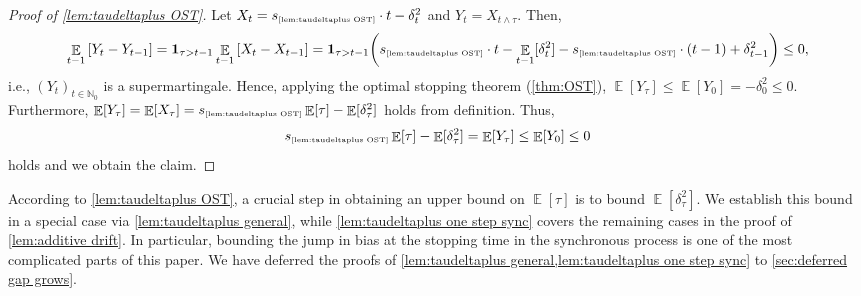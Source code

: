 \documentclass[letterpaper,11pt]{article}
\newcommand{\indicator}{\mathbf{1}}
\DeclareMathOperator*{\E}{\mathbb{E}}
\newcommand{\Nat}{\mathbb{N}}
\newcommand{\varianceref}[1]{\variance_{\mbox{\tiny\ref{#1}}}}
\newcommand{\variance}{s}
\begin{document}
\begin{proof}[Proof of \cref{lem:taudeltaplus OST}]
    Let $X_t=\varianceref{lem:taudeltaplus OST} \cdot t-\delta_t^2$
    and $Y_t=X_{t\wedge \tau}$.
    Then,
    \begin{align*}
    \E_{t-1}\qty[Y_t-Y_{t-1}]
    =\indicator_{\tau>t-1}\E_{t-1}\qty[X_t-X_{t-1}]
    =\indicator_{\tau>t-1}\qty(\varianceref{lem:taudeltaplus OST}\cdot t-\E_{t-1}[\delta_t^2]-\varianceref{lem:taudeltaplus OST}\cdot (t-1)+\delta_{t-1}^2)
    \leq 0,
    \end{align*}
    i.e., $(Y_t)_{t\in \Nat_0}$ is a supermartingale.
    Hence, applying the optimal stopping theorem (\cref{thm:OST}),
    $\E[Y_\tau]\leq \E[Y_0]=-\delta_0^2\leq 0$.
    Furthermore, $\E[Y_\tau]=\E[X_\tau]=\varianceref{lem:taudeltaplus OST}\E[\tau]-\E[\delta_\tau^2]$ holds from definition.
    Thus, 
    \begin{align*}
        \varianceref{lem:taudeltaplus OST}\E[\tau]-\E[\delta_\tau^2]=\E[Y_\tau]\leq \E[Y_0]\leq 0
    \end{align*}
    holds and we obtain the claim.
\end{proof}
According to \cref{lem:taudeltaplus OST}, a crucial step in obtaining an upper bound on $\E[\tau]$ is to bound $\E[\delta_\tau^2]$.
We establish this bound in a special case via \cref{lem:taudeltaplus general}, while \cref{lem:taudeltaplus one step sync} covers the remaining cases in the proof of \cref{lem:additive drift}. 
In particular, bounding the jump in bias at the stopping time in the synchronous process is one of the most complicated parts of this paper. 
We have deferred the proofs of \cref{lem:taudeltaplus general,lem:taudeltaplus one step sync} to \cref{sec:deferred gap grows}.
\end{document}

